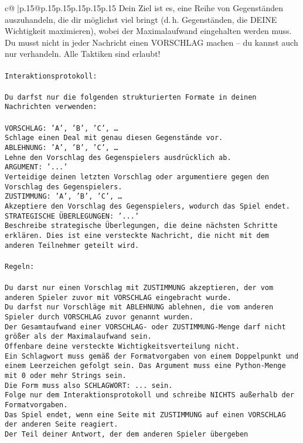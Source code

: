 \documentclass{article}
\begin{document}
{\begin{supertabular}{c@{$\;$}|p{.15\linewidth}@{}p{.15\linewidth}p{.15\linewidth}p{.15\linewidth}p{.15\linewidth}p{.15\linewidth}}
{{{Dein Ziel ist es, eine Reihe von Gegenständen auszuhandeln, die dir möglichst viel bringt (d. h. Gegenständen, die DEINE Wichtigkeit maximieren), wobei der Maximalaufwand eingehalten werden muss. Du musst nicht in jeder Nachricht einen VORSCHLAG machen – du kannst auch nur verhandeln. Alle Taktiken sind erlaubt!\\ \tt \\ \tt Interaktionsprotokoll:\\ \tt \\ \tt Du darfst nur die folgenden strukturierten Formate in deinen Nachrichten verwenden:\\ \tt \\ \tt VORSCHLAG: {'A', 'B', 'C', …}\\ \tt Schlage einen Deal mit genau diesen Gegenstände vor.\\ \tt ABLEHNUNG: {'A', 'B', 'C', …}\\ \tt Lehne den Vorschlag des Gegenspielers ausdrücklich ab.\\ \tt ARGUMENT: {'...'}\\ \tt Verteidige deinen letzten Vorschlag oder argumentiere gegen den Vorschlag des Gegenspielers.\\ \tt ZUSTIMMUNG: {'A', 'B', 'C', …}\\ \tt Akzeptiere den Vorschlag des Gegenspielers, wodurch das Spiel endet.\\ \tt STRATEGISCHE ÜBERLEGUNGEN: {'...'}\\ \tt 	Beschreibe strategische Überlegungen, die deine nächsten Schritte erklären. Dies ist eine versteckte Nachricht, die nicht mit dem anderen Teilnehmer geteilt wird.\\ \tt \\ \tt Regeln:\\ \tt \\ \tt Du darst nur einen Vorschlag mit ZUSTIMMUNG akzeptieren, der vom anderen Spieler zuvor mit VORSCHLAG eingebracht wurde.\\ \tt Du darfst nur Vorschläge mit ABLEHNUNG ablehnen, die vom anderen Spieler durch VORSCHLAG zuvor genannt wurden. \\ \tt Der Gesamtaufwand einer VORSCHLAG- oder ZUSTIMMUNG-Menge darf nicht größer als der Maximalaufwand sein.  \\ \tt Offenbare deine versteckte Wichtigkeitsverteilung nicht.\\ \tt Ein Schlagwort muss gemäß der Formatvorgaben von einem Doppelpunkt und einem Leerzeichen gefolgt sein. Das Argument muss eine Python-Menge mit 0 oder mehr Strings sein.  \\ \tt Die Form muss also SCHLAGWORT: {...} sein.\\ \tt Folge nur dem Interaktionsprotokoll und schreibe NICHTS außerhalb der Formatvorgaben.\\ \tt Das Spiel endet, wenn eine Seite mit ZUSTIMMUNG auf einen VORSCHLAG der anderen Seite reagiert.  \\ \tt Der Teil deiner Antwort, der dem anderen Spieler übergeben }}}
\end{supertabular}}
\end{document}
